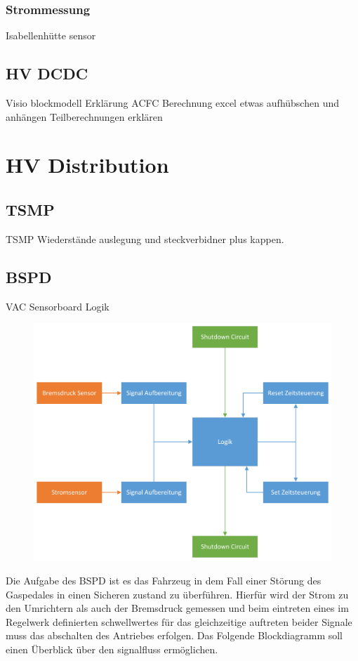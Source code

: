 \subsubsection{Strommessung}
Isabellenhütte sensor

\subsection{HV DCDC}
Visio blockmodell
Erklärung ACFC
Berechnung excel etwas aufhübschen und anhängen
Teilberechnungen erklären

\section{HV Distribution}

\subsection{TSMP}
TSMP Wiederstände auslegung und steckverbidner plus kappen.

\subsection{BSPD}

VAC Sensorboard
Logik
\begin{figure}
	\centering
	\includegraphics[width=0.7\linewidth]{"bilder/BSPD Blockdiagramm"}
	\caption{}
	\label{fig:bspd-blockdiagramm}
\end{figure}

Die Aufgabe des BSPD ist es das Fahrzeug in dem Fall einer Störung des Gaspedales in einen Sicheren zustand zu überführen. Hierfür wird der Strom zu den Umrichtern als auch der Bremsdruck gemessen und beim eintreten eines im Regelwerk definierten schwellwertes für das gleichzeitige auftreten beider Signale muss das abschalten des Antriebes erfolgen. Das Folgende Blockdiagramm soll einen Überblick über den signalfluss ermöglichen.

